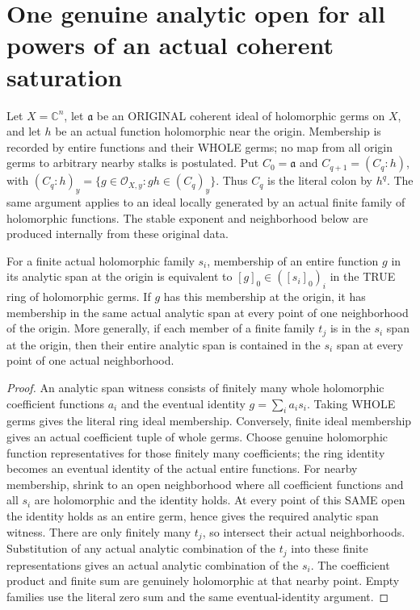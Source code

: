 \section{One genuine analytic open for all powers of an actual coherent saturation}
Let $X=\mathbb C^n$, let $\mathfrak a$ be an ORIGINAL coherent ideal of
holomorphic germs on $X$, and let $h$ be an actual function holomorphic
near the origin. Membership is recorded by entire functions and their
WHOLE germs; no map from all origin germs to arbitrary nearby stalks is
postulated. Put $C_0=\mathfrak a$ and $C_{q+1}=(C_q:h)$, with
$(C_q:h)_y=\{g\in\mathcal O_{X,y}:gh\in(C_q)_y\}$.
Thus $C_q$ is the literal colon by $h^q$. The same argument applies to
an ideal locally generated by an actual finite family of holomorphic
functions. The stable exponent and neighborhood below are produced
internally from these original data.

\begin{lemma}
\label{hir:relative-normal-coherent-saturation-finite-span}
\leanok
For a finite actual holomorphic family $s_i$, membership of an entire
function $g$ in its analytic span at the origin is equivalent to
$[g]_0\in( [s_i]_0)_i$ in the TRUE ring of holomorphic germs.
If $g$ has this membership at the origin, it has membership in the
same actual analytic span at every point of one neighborhood of the
origin. More generally, if each member of a finite family $t_j$ is in
the $s_i$ span at the origin, then their entire analytic span is
contained in the $s_i$ span at every point of one actual neighborhood.
\end{lemma}
\begin{proof}
An analytic span witness consists of finitely many whole holomorphic
coefficient functions $a_i$ and the eventual identity
$g=\sum_i a_i s_i$. Taking WHOLE germs gives the literal ring ideal
membership. Conversely, finite ideal membership gives an actual
coefficient tuple of whole germs. Choose genuine holomorphic function
representatives for those finitely many coefficients; the ring
identity becomes an eventual identity of the actual entire functions.
For nearby membership, shrink to an open neighborhood where all
coefficient functions and all $s_i$ are holomorphic and the identity
holds. At every point of this SAME open the identity holds as an
entire germ, hence gives the required analytic span witness. There
are only finitely many $t_j$, so intersect their actual neighborhoods.
Substitution of any actual analytic combination of the $t_j$ into
these finite representations gives an actual analytic combination
of the $s_i$. The coefficient product and finite sum are genuinely
holomorphic at that nearby point. Empty families use the literal
zero sum and the same eventual-identity argument.
\end{proof}

